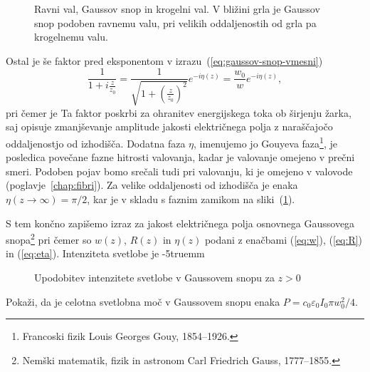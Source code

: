 \begin{figure}[h]
\centering
\def\svgwidth{90truemm} 

\caption{Ravni val, Gaussov snop in
krogelni val. V bližini grla je Gaussov snop podoben ravnemu valu, 
pri velikih oddaljenostih od grla pa krogelnemu valu.}
\label{fig:ravni-Gaussov-krogelni-val}
\end{figure}

Ostal je  še faktor pred eksponentom v izrazu~(\ref{eq:gaussov-snop-vmesni})
\begin{equation}
\frac{1}{1+i\frac{z}{z_{0}}}=\frac{1}{\sqrt{1+(\frac{z}{z_0})^{2}}}e^{-i\eta(z)}=\frac{w_{0}}{w}e^{-i\eta(z)},
\end{equation}
 pri čemer je
Ta faktor poskrbi za ohranitev energijskega toka ob širjenju žarka, saj opisuje zmanjševanje amplitude
jakosti električnega polja z naraščajočo oddaljenostjo od izhodišča.  
Dodatna faza $\eta$, imenujemo jo Gouyeva 
faza\footnote{Francoski fizik Louis Georges Gouy, 1854--1926.},
je posledica povečane fazne hitrosti valovanja, 
kadar je valovanje omejeno v prečni smeri. Podoben pojav bomo srečali tudi pri valovanju, ki je 
omejeno v valovode (poglavje~\ref{chap:fibri}). Za velike oddaljenosti od izhodišča je enaka $\eta (z\to\infty) = \pi/2$,
kar je v skladu s faznim zamikom na sliki~(\ref{fig:ravni-Gaussov-krogelni-val}).

S tem končno zapišemo izraz za jakost električnega polja osnovnega Gaussovega 
snopa\footnote{Nemški matematik, fizik in astronom Carl Friedrich Gauss, 1777--1855.}
pri čemer so $w(z)$, $R(z)$ in $\eta(z)$ podani z enačbami (\ref{eq:w}), (\ref{eq:R}) in (\ref{eq:eta}).
Intenziteta svetlobe je 
\vglue-5truemm
\begin{figure}[h]
\centering
\def\svgwidth{100truemm} 

\caption{Upodobitev intenzitete svetlobe v Gaussovem snopu za $z>0$ }
\label{fig:Gauss_3D}
\end{figure}

\begin{definition}
\label{naloga-širina-snopa}
Pokaži, da je celotna svetlobna moč v Gaussovem snopu 
enaka 
$P = c_0 \varepsilon_0 I_0 \pi w_0^2/4$.
\end{definition}


